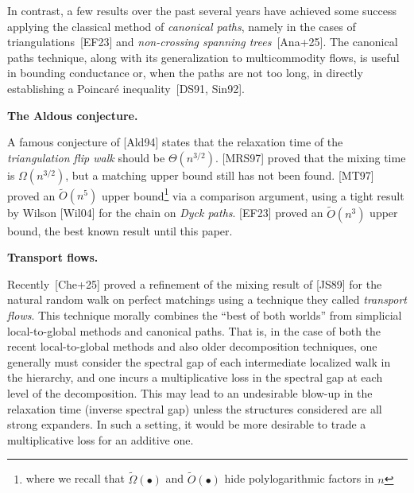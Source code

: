 In contrast, a few results over the past several years have achieved some success applying the classical method of \emph{canonical paths}, namely in the cases of triangulations [EF23] and \emph{non-crossing spanning trees} [Ana+25].
The canonical paths technique, along with its generalization to multicommodity flows, is useful in bounding conductance or, when the paths are not too long, in directly establishing a Poincaré inequality [DS91, Sin92].\par





\par\medskip\noindent\textbf{The Aldous conjecture.}\par




A famous conjecture of [Ald94] states that the relaxation time of the \emph{triangulation flip walk} should be $\Theta(n^{3/2})$. [MRS97] proved that the mixing time is $\Omega(n^{3/2})$, but a matching upper bound still has not been found. [MT97] proved an $\widetilde{O}(n^{5})$ upper bound\footnote{
              
              
              
              
              
              
              
              
            where we recall that $\widetilde{\Omega}(\bullet)$ and $\widetilde{O}(\bullet)$ hide polylogarithmic factors in $n$} via a comparison argument, using a tight result by Wilson [Wil04] for the chain on \emph{Dyck paths}. [EF23] proved an $\widetilde{O}(n^{3})$ upper bound, the best known result until this paper.\par





\par\medskip\noindent\textbf{Transport flows.}\par




Recently [Che+25] proved a refinement of the mixing result of [JS89] for the natural random walk on perfect matchings using a technique they called \emph{transport flows}. This technique morally combines the “best of both worlds” from simplicial local-to-global methods and canonical paths. That is, in the case of both the recent local-to-global methods and also older decomposition techniques, one generally must consider the spectral gap of each intermediate localized walk in the hierarchy, and one incurs a multiplicative loss in the spectral gap at each level of the decomposition. This may lead to an undesirable blow-up in the relaxation time (inverse spectral gap) unless the structures considered are all strong expanders. In such a setting, it would be more desirable to trade a multiplicative loss for an additive one.\par




